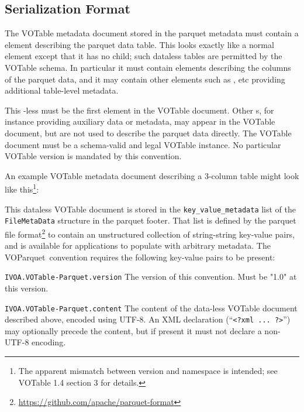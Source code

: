 \documentclass[11pt,a4paper]{ivoa}
\newcommand{\voparquet}{VOParquet}
\begin{document}
\subsection{Serialization Format}
\label{sec:format}

The VOTable metadata document stored in the parquet metadata
must contain a  element describing the parquet data table.
This looks exactly like a normal  element
except that it has no  child;
such dataless tables are permitted by the VOTable schema.
In particular it must contain  elements describing the
columns of the parquet data,
and it may contain other elements such as ,  etc
providing additional table-level metadata.
 
This -less  must be the first
 element in the VOTable document.
Other s,
for instance providing auxiliary data or metadata,
may appear in the VOTable document,
but are not used to describe the parquet data directly.
The VOTable document must be a schema-valid and legal VOTable instance.
No particular VOTable version is mandated by this convention.

An example VOTable metadata document describing a 3-column table
might look like this\footnote{
  The apparent mismatch between version and namespace is intended;
  see VOTable 1.4 section 3 for details.}:


This dataless VOTable document is stored in the
{\tt key\_value\_metadata} list of the
{\tt FileMetaData} structure in the parquet footer.
That list is defined by the parquet file
format\footnote{\url{https://github.com/apache/parquet-format}}
to contain an unstructured collection of string-string key-value pairs,
and is available for applications to populate with arbitrary metadata.
The \voparquet\ convention requires the following key-value pairs
to be present:
\begin{bigdescription}
\item[{\tt IVOA.VOTable-Parquet.version}]
   The version of this convention.  Must be "1.0" at this version.
\item[{\tt IVOA.VOTable-Parquet.content}]
   The content of the data-less VOTable document described above,
   encoded using UTF-8.
   An XML declaration (``\verb|<?xml ... ?>|'') may optionally
   precede the content,
   but if present it must not declare a non-UTF-8 encoding.
\end{bigdescription}
\end{document}
